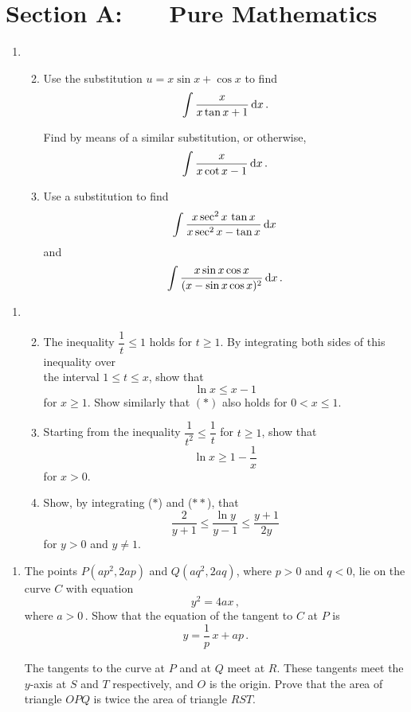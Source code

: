 \documentclass[a4, 11pt]{report}
\newlength{\qspace}
\newcounter{qnumber}
\newenvironment{question}%
 {\vspace{\qspace}
  \begin{enumerate}[\bfseries 1\quad][10]%
    \setcounter{enumi}{\value{qnumber}}%
    \item%
 }
{
  \end{enumerate}
  \filbreak
  \stepcounter{qnumber}
 }
\newenvironment{questionparts}[1][1]%
 {
  \begin{enumerate}[\bfseries (i)]%
    \setcounter{enumii}{#1}
    \addtocounter{enumii}{-1}
    \setlength{\itemsep}{5mm}
    \setlength{\parskip}{8pt}
 }
 {
  \end{enumerate}
 }
\def\d{{\rm d}}
\def\le{\leqslant}
\def\ge{\geqslant}
\begin{document}
\setcounter{page}{2}

 
\section*{Section A: \ \ \ Pure Mathematics}

\begin{question}
\begin{questionparts}
\item Use   the substitution $u= x\sin x +\cos x$ to find
\[
\int \frac{x }{x\tan x +1 } \, \d x
\,.
\]

Find by means of a similar substitution, or otherwise,   
\[
\int \frac{x }{x\cot x -1 } \, \d x
\,.
\]
\item Use a substitution  to find
\vspace{2mm}
\[
\int \frac{x\sec^2 x \, \tan x}{x\sec^2 x -\tan x} \,\d x
\,
\]
\vspace{2mm}
and 
\vspace{2mm}
\[
\int \frac{x\sin x \cos x}{(x-\sin x \cos x)^2} \, \d x
\,.
\]
\end{questionparts}




\end{question}


\begin{question}           
\begin{questionparts}
\item The inequality $\dfrac 1 t \le 1$ holds for $t\ge1$.
By integrating both sides of this  inequality 
over
\\[3mm]
 the interval $1\le t \le x$,
show that 
\[ 
\ln x \le x-1
\tag{$*$}
\]
 for $x \ge 1$. Show similarly 
that $(*)$ also holds for $0 < x \le 1$.

\item
Starting from the inequality
$\dfrac{1}{t^2} \le \dfrac1 t $ for $t \ge 1$,
show that 
\[ 
\ln x \ge 1-\frac{1}{x}
\tag{$**$}
\]
for $x > 0$.

\item
Show, by integrating ($*$) and ($**$), that
\[
\frac{2}{ y+1} \le \frac{\ln  y}{ y-1} \le \frac{ y+1}{2 y}
\] 
for $ y > 0$ and $ y\ne1$.




\end{questionparts}
\end{question}



\begin{question}
The points $P(ap^2, 2ap)$ and $Q(aq^2, 2aq)$, where $p>0$ and $q<0$,
 lie on the curve $C$ with equation 
$$y^2= 4ax\,,
$$ 
where $a>0\,$. Show that the equation of the tangent to $C$ at $P$ is
$$y= \frac 1 p \, x +ap\,.$$

The tangents to the curve at $P$ and at $Q $ meet at $R$.      
These tangents meet the 
$y$-axis at $S$ and $T$ respectively, and $O$ is the origin.
Prove that the area of triangle $OPQ$ is  twice the area of triangle $RST$.

\end{question}
\end{document}
